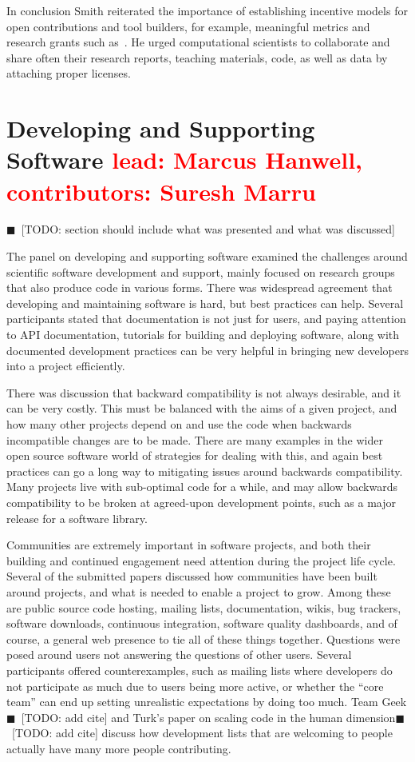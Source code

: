 \documentclass[11pt, oneside]{amsart}
\newcommand{\todo}[1]{{\color{blue}$\blacksquare$~\textsf{[TODO: #1]}}}
\newcommand{\note}[1]{ {\textcolor{red}    { #1 }}}
\begin{document}
In conclusion Smith reiterated the importance of establishing
incentive models for open contributions and tool builders, for
example, meaningful metrics and research grants such as~\cite{NSF_software_vision}. He urged computational scientists to
collaborate and share often their research reports, teaching
materials, code, as well as data by attaching proper licenses.

\section{Developing and Supporting Software \note{lead: Marcus Hanwell, contributors: Suresh Marru}} \label{sec:devel}

\todo{section should include what was presented and what was discussed}

The panel on developing and supporting software examined the challenges
around scientific software development and support, mainly focused on research
groups that also produce code in various forms. There was widespread agreement
that developing and maintaining software is hard, but best practices can help.
Several participants stated that documentation is not just for users, and paying attention
to API documentation, tutorials for building and deploying software, along with
documented development practices can be very helpful in bringing  new developers
into a project efficiently.

There was discussion that backward compatibility is not always desirable, and it
can be very costly. This must be balanced with the aims of a given project, and how
many other projects depend on and use the code when backwards incompatible
changes are to be made. There are many examples in the wider open source
software world of strategies for dealing with this, and again best practices
can go a long way to mitigating issues around backwards compatibility. Many
projects live with sub-optimal code for a while, and may allow backwards
compatibility to be broken at agreed-upon development points, such as a major
release for a software library.

Communities are extremely important in software projects, and both their
building and continued engagement need attention during the project life cycle.
Several of the submitted papers discussed how communities have been built around
projects, and what is needed to enable a project to grow. Among these are public
source code hosting, mailing lists, documentation, wikis, bug trackers, software
downloads, continuous integration, software quality dashboards, and of course,
a general web presence to tie all of these things together. Questions were posed
around users not answering the questions of other users. Several participants
offered counterexamples, such as mailing lists where developers do not participate
as much due to users being more active, or whether the ``core
team'' can end up setting unrealistic expectations by doing too much. Team Geek\todo{add cite}
and Turk's paper on scaling code in the human dimension\todo{add cite}  discuss how development
lists that are welcoming to people actually have many more people contributing.
\end{document}

